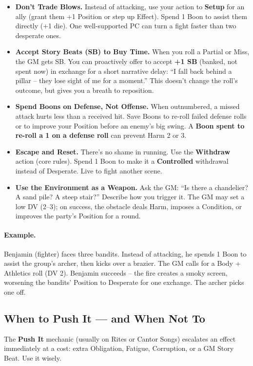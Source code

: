\begin{itemize}
  \item \textbf{Don't Trade Blows.} Instead of attacking, use your action to \textbf{Setup} for an ally (grant them +1 Position or step up Effect). Spend 1 Boon to assist them directly (+1 die). One well-supported PC can turn a fight faster than two desperate ones.
  \item \textbf{Accept Story Beats (SB) to Buy Time.} When you roll a Partial or Miss, the GM gets SB. You can proactively offer to accept \textbf{+1 SB} (banked, not spent now) in exchange for a short narrative delay: ``I fall back behind a pillar -- they lose sight of me for a moment.'' This doesn't change the roll's outcome, but gives you a breath to reposition.
  \item \textbf{Spend Boons on Defense, Not Offense.} When outnumbered, a missed attack hurts less than a received hit. Save Boons to re-roll failed defense rolls or to improve your Position before an enemy's big swing. A \textbf{Boon spent to re-roll a 1 on a defense roll} can prevent Harm 2 or 3.
  \item \textbf{Escape and Reset.} There's no shame in running. Use the \textbf{Withdraw} action (core rules). Spend 1 Boon to make it a \textbf{Controlled} withdrawal instead of Desperate. Live to fight another scene.
  \item \textbf{Use the Environment as a Weapon.} Ask the GM: ``Is there a chandelier? A sand pile? A steep stair?'' Describe how you trigger it. The GM may set a low DV (2--3); on success, the obstacle deals Harm, imposes a Condition, or improves the party's Position for a round.
\end{itemize}

\paragraph{Example.}
Benjamin (fighter) faces three bandits. Instead of attacking, he spends 1 Boon to assist the group's archer, then kicks over a brazier. The GM calls for a Body + Athletics roll (DV 2). Benjamin succeeds -- the fire creates a smoky screen, worsening the bandits' Position to Desperate for one exchange. The archer picks one off.

\subsection{When to Push It --- and When Not To}

The \textbf{Push It} mechanic (usually on Rites or Cantor Songs) escalates an effect immediately at a cost: extra Obligation, Fatigue, Corruption, or a GM Story Beat. Use it wisely.

